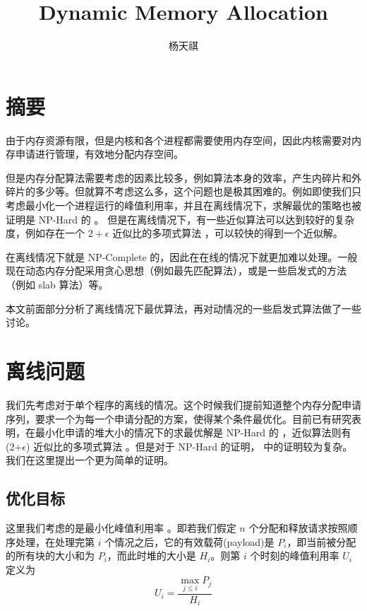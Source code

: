 \documentclass{noiassignment}
\title{Dynamic Memory Allocation}
\author{杨天祺}
\begin{document}
	\maketitle

	\tableofcontents

	\newpage

	\section{摘要}
	由于内存资源有限，但是内核和各个进程都需要使用内存空间，因此内核需要对内存申请进行管理，有效地分配内存空间。

	但是内存分配算法需要考虑的因素比较多，例如算法本身的效率，产生内碎片和外碎片的多少等。但就算不考虑这么多，这个问题也是极其困难的。例如即使我们只考虑最小化一个进程运行的峰值利用率，并且在离线情况下，求解最优的策略也被证明是 NP-Hard 的 \cite{opt-nph}。
	但是在离线情况下，有一些近似算法可以达到较好的复杂度，例如存在一个 $2 + \epsilon$ 近似比的多项式算法 \cite{M2015A}，可以较快的得到一个近似解。

	在离线情况下就是 NP-Complete 的，因此在在线的情况下就更加难以处理。一般现在动态内存分配采用贪心思想（例如最先匹配算法），或是一些启发式的方法（例如 slab 算法\cite{bonwick1994slab}）等。

	本文前面部分分析了离线情况下最优算法，再对动情况的一些启发式算法做了一些讨论。

	\section{离线问题}
	我们先考虑对于单个程序的离线的情况。这个时候我们提前知道整个内存分配申请序列，要求一个为每一个申请分配的方案，使得某个条件最优化。目前已有研究表明，在最小化申请的堆大小的情况下的求最优解是 NP-Hard 的 \cite{opt-nph}，近似算法则有 (2+$\epsilon$) 近似比的多项式算法 \cite{M2015A}。但是对于 NP-Hard 的证明， \cite{opt-nph} 中的证明较为复杂。我们在这里提出一个更为简单的证明。

	\subsection{优化目标}

	这里我们考虑的是最小化峰值利用率 \cite{Bryant:2015:CSP:2846227}。即若我们假定 $n$ 个分配和释放请求按照顺序处理，在处理完第 $i$ 个情况之后，它的有效载荷(payload)是 $P_i$，即当前被分配的所有块的大小和为 $P_i$，而此时堆的大小是 $H_i$。则第 $i$ 个时刻的峰值利用率 $U_i$ 定义为
	$$
	U_i = \frac{\max_{j \le i} P_j}{H_i}
	$$
\end{document}
